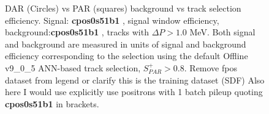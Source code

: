\begin{figure}[H]
  \hspace{-0.6in}
  \caption{
    \label{fig:mumep_trq_ann} 
    DAR (Circles) vs PAR (squares) background vs track selection efficiency.
    Signal: {\bf cpos0s51b1} , signal window {\blue efficiency}, background:{\bf cpos0s51b1} , tracks with $\Delta{P} > 1.0$ MeV.
    Both signal and background are measured in units of signal and background {\blue efficiency} corresponding to the selection
    using {\blue the} default Offline v9\_0\_5 ANN-based track selection, $S_{PAR}^+ > 0.8$.
    {\blue Remove fpos dataset from legend or clarify this is the training dataset} {\blue (SDF) Also here I would use explicitly use positrons with 1 batch pileup quoting {\bf cpos0s51b1} in brackets.}
  }
\end{figure}


